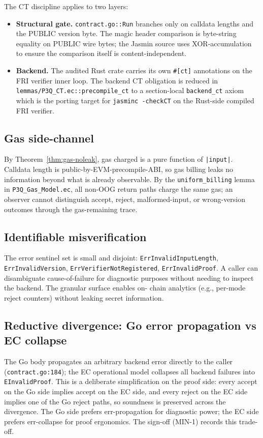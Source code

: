 \documentclass[11pt,a4paper]{article}
\begin{document}
The CT discipline applies to two layers:
\begin{itemize}
\item \textbf{Structural gate.} \texttt{contract.go::Run} branches
only on calldata lengths and the PUBLIC version byte. The magic
header comparison is byte-string equality on PUBLIC wire bytes; the
Jasmin source uses XOR-accumulation to ensure the comparison itself
is content-independent.
\item \textbf{Backend.} The audited Rust crate carries its own
\texttt{\#[ct]} annotations on the FRI verifier inner loop. The
backend CT obligation is reduced in
\texttt{lemmas/P3Q\_CT.ec::precompile\_ct} to a section-local
\texttt{backend\_ct} axiom which is the porting target for
\texttt{jasminc -checkCT} on the Rust-side compiled FRI verifier.
\end{itemize}

\subsection{Gas side-channel}

By Theorem~\ref{thm:gas-noleak}, gas charged is a pure function of
\texttt{|input|}. Calldata length is public-by-EVM-precompile-ABI, so
gas billing leaks no information beyond what is already observable.
By the \texttt{uniform\_billing} lemma in \texttt{P3Q\_Gas\_Model.ec},
all non-OOG return paths charge the same gas; an observer cannot
distinguish accept, reject, malformed-input, or wrong-version
outcomes through the gas-remaining trace.

\subsection{Identifiable misverification}

The error sentinel set is small and disjoint:
\texttt{ErrInvalidInputLength}, \texttt{ErrInvalidVersion},
\texttt{ErrVerifierNotRegistered}, \texttt{ErrInvalidProof}. A caller
can disambiguate cause-of-failure for diagnostic purposes without
needing to inspect the backend. The granular surface enables on-
chain analytics (e.g., per-mode reject counters) without leaking
secret information.

\subsection{Reductive divergence: Go error propagation vs EC collapse}

The Go body propagates an arbitrary backend error directly to the
caller (\texttt{contract.go:184}); the EC operational model collapses
all backend failures into \texttt{EInvalidProof}. This is a
deliberate simplification on the proof side: every accept on the Go
side implies accept on the EC side, and every reject on the EC side
implies one of the Go reject paths, so soundness is preserved across
the divergence. The Go side prefers err-propagation for diagnostic
power; the EC side prefers err-collapse for proof ergonomics. The
sign-off (MIN-1) records this trade-off.
\end{document}

